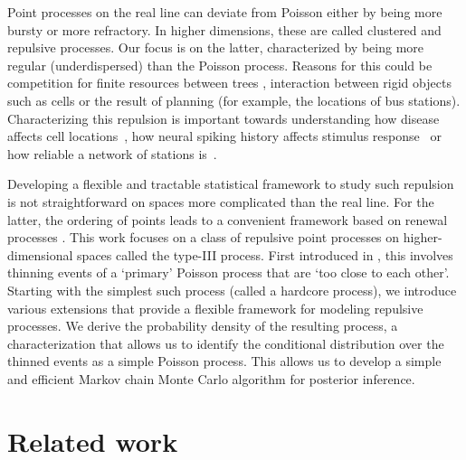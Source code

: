 \documentclass{statsoc}
\begin{document}
Point processes on the real line can deviate from Poisson either by being more bursty or more refractory. In higher dimensions, 
these are called {clustered} and {repulsive} processes.  Our focus is on the latter,
characterized by being more regular (underdispersed) than the Poisson process. Reasons for this could be competition for finite resources 
between trees \citep{Strand72}, interaction between rigid objects such as cells \citep{WallSar11} or 
the result of planning (for example, the locations of bus stations).
Characterizing this repulsion is important towards understanding how disease affects cell locations~\citep{WallSar11}, how neural spiking
history affects stimulus response~\citep{Brown2004a} or how reliable a network of stations is~\citep{Sahin2007}.


Developing a flexible and tractable statistical framework to study such 
repulsion is not straightforward on spaces more complicated than the real line.  
For the latter, the ordering of points leads to a convenient framework based on renewal processes \citep{DalVer2008a}.
This work focuses on a class of repulsive point processes on higher-dimensional spaces called the \matern type-III process. First introduced in \citet{Matern60, Matern86}, 
this involves thinning events of a `primary' Poisson process that are `too close to each other'. 
Starting with the simplest such process (called a hardcore process), we introduce various extensions that provide a flexible framework for modeling
repulsive processes. We derive the probability density of the resulting process, a characterization that allows us to identify the conditional 
distribution over the thinned events as a simple Poisson process. This allows us to develop a simple and efficient Markov chain Monte Carlo algorithm for 
posterior inference. 

\section{Related work}
\end{document}
